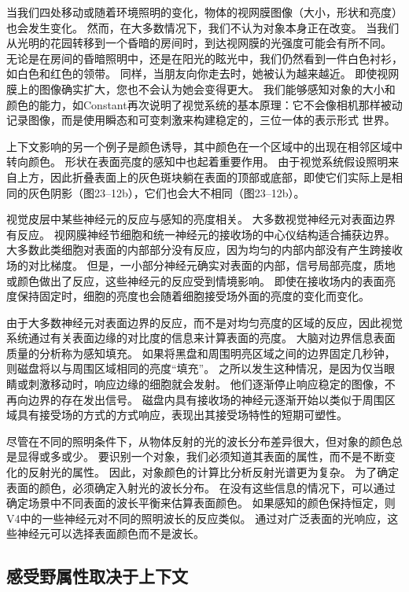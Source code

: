 当我们四处移动或随着环境照明的变化，物体的视网膜图像（大小，形状和亮度）也会发生变化。
然而，在大多数情况下，我们不认为对象本身正在改变。 
当我们从光明的花园转移到一个昏暗的房间时，到达视网膜的光强度可能会有所不同。
无论是在房间的昏暗照明中，还是在阳光的眩光中，我们仍然看到一件白色衬衫，如白色和红色的领带。
同样，当朋友向你走去时，她被认为越来越近。
即使视网膜上的图像确实扩大，您也不会认为她会变得更大。
我们能够感知对象的大小和颜色的能力，如Constant再次说明了视觉系统的基本原理：它不会像相机那样被动记录图像，而是使用瞬态和可变刺激来构建稳定的，三位一体的表示形式 世界。


上下文影响的另一个例子是颜色诱导，其中颜色在一个区域中的出现在相邻区域中转向颜色。
形状在表面亮度的感知中也起着重要作用。
由于视觉系统假设照明来自上方，因此折叠表面上的灰色斑块躺在表面的顶部或底部，即使它们实际上是相同的灰色阴影（图23–12b），它们也会大不相同（图23–12b）。


视觉皮层中某些神经元的反应与感知的亮度相关。 
大多数视觉神经元对表面边界有反应。
视网膜神经节细胞和统一神经元的接收场的中心仪结构适合捕获边界。
大多数此类细胞对表面的内部部分没有反应，因为均匀的内部内部没有产生跨接收场的对比梯度。
但是，一小部分神经元确实对表面的内部，信号局部亮度，质地或颜色做出了反应，这些神经元的反应受到情境影响。
即使在接收场内的表面亮度保持固定时，细胞的亮度也会随着细胞接受场外面的亮度的变化而变化。


由于大多数神经元对表面边界的反应，而不是对均匀亮度的区域的反应，因此视觉系统通过有关表面边缘的对比度的信息来计算表面的亮度。
大脑对边界信息表面质量的分析称为感知填充。
如果将黑盘和周围明亮区域之间的边界固定几秒钟，则磁盘将以与周围区域相同的亮度“填充”。
之所以发生这种情况，是因为仅当眼睛或刺激移动时，响应边缘的细胞就会发射。
他们逐渐停止响应稳定的图像，不再向边界的存在发出信号。
磁盘内具有接收场的神经元逐渐开始以类似于周围区域具有接受场的方式的方式响应，表现出其接受场特性的短期可塑性。


尽管在不同的照明条件下，从物体反射的光的波长分布差异很大，但对象的颜色总是显得或多或少。
要识别一个对象，我们必须知道其表面的属性，而不是不断变化的反射光的属性。
因此，对象颜色的计算比分析反射光谱更为复杂。
为了确定表面的颜色，必须确定入射光的波长分布。
在没有这些信息的情况下，可以通过确定场景中不同表面的波长平衡来估算表面颜色。
如果感知的颜色保持恒定，则V4中的一些神经元对不同的照明波长的反应类似。
通过对广泛表面的光响应，这些神经元可以选择表面颜色而不是波长。


\subsection{感受野属性取决于上下文}

